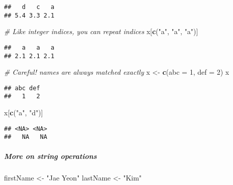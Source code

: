 \documentclass[
]{book}
\newenvironment{Shaded}{\begin{snugshade}}{\end{snugshade}}
\newcommand{\CommentTok}[1]{\textcolor[rgb]{0.56,0.35,0.01}{\textit{#1}}}
\newcommand{\DataTypeTok}[1]{\textcolor[rgb]{0.13,0.29,0.53}{#1}}
\newcommand{\DecValTok}[1]{\textcolor[rgb]{0.00,0.00,0.81}{#1}}
\newcommand{\KeywordTok}[1]{\textcolor[rgb]{0.13,0.29,0.53}{\textbf{#1}}}
\newcommand{\NormalTok}[1]{#1}
\newcommand{\StringTok}[1]{\textcolor[rgb]{0.31,0.60,0.02}{#1}}
\begin{document}
\begin{verbatim}
##   d   c   a 
## 5.4 3.3 2.1
\end{verbatim}

\begin{Shaded}
\begin{Highlighting}[]
\CommentTok{\# Like integer indices, you can repeat indices}
\NormalTok{x[}\KeywordTok{c}\NormalTok{(}\StringTok{"a"}\NormalTok{, }\StringTok{"a"}\NormalTok{, }\StringTok{"a"}\NormalTok{)]}
\end{Highlighting}
\end{Shaded}

\begin{verbatim}
##   a   a   a 
## 2.1 2.1 2.1
\end{verbatim}

\begin{Shaded}
\begin{Highlighting}[]
\CommentTok{\# Careful! names are always matched exactly}
\NormalTok{x \textless{}{-}}\StringTok{ }\KeywordTok{c}\NormalTok{(}\DataTypeTok{abc =} \DecValTok{1}\NormalTok{, }\DataTypeTok{def =} \DecValTok{2}\NormalTok{)}
\NormalTok{x}
\end{Highlighting}
\end{Shaded}

\begin{verbatim}
## abc def 
##   1   2
\end{verbatim}

\begin{Shaded}
\begin{Highlighting}[]
\NormalTok{x[}\KeywordTok{c}\NormalTok{(}\StringTok{"a"}\NormalTok{, }\StringTok{"d"}\NormalTok{)]}
\end{Highlighting}
\end{Shaded}

\begin{verbatim}
## <NA> <NA> 
##   NA   NA
\end{verbatim}

\hypertarget{more-on-string-operations}{%
\subparagraph{More on string operations}\label{more-on-string-operations}}

\begin{Shaded}
\begin{Highlighting}[]
\NormalTok{firstName \textless{}{-}}\StringTok{ "Jae Yeon"}
\NormalTok{lastName \textless{}{-}}\StringTok{ "Kim"}
\end{Highlighting}
\end{Shaded}
\end{document}
